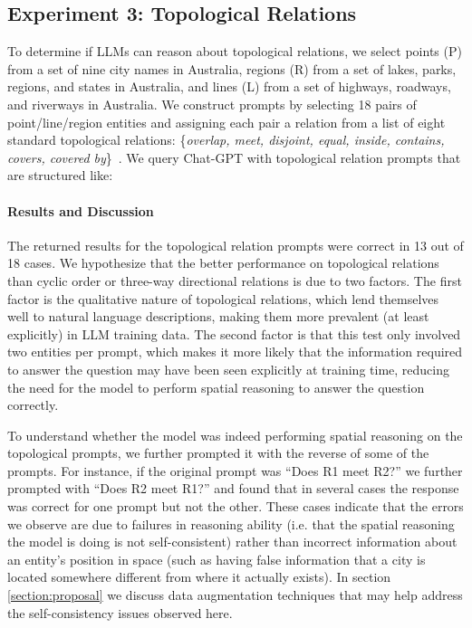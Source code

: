 \subsection{Experiment 3: Topological Relations}
To determine if LLMs can reason about topological relations, we select points (P) from a set of nine city names in Australia, regions (R) from a set of lakes, parks, regions, and states in Australia, and lines (L) from a set of highways, roadways, and riverways in Australia.
We construct prompts by selecting 18 pairs of point/line/region entities and assigning each pair a relation from a list of eight standard topological relations: \{\textit{overlap, meet, disjoint, equal, inside, contains, covers, covered by}\}~\cite{Carniel2023}.
We query Chat-GPT with topological relation prompts that are structured like:
\begin{center}
\end{center}

\paragraph{Results and Discussion}
The returned results for the topological relation prompts were correct in 13 out of 18 cases.
We hypothesize that the better performance on topological relations than cyclic order or three-way directional relations is due to two factors.
The first factor is the qualitative nature of topological relations, which lend themselves well to natural language descriptions, making them more prevalent (at least explicitly) in LLM training data.
The second factor is that this test only involved two entities per prompt, which makes it more likely that the information required to answer the question may have been seen explicitly at training time, reducing the need for the model to perform spatial reasoning to answer the question correctly.

To understand whether the model was indeed performing spatial reasoning on the topological prompts, we further prompted it with the reverse of some of the prompts.
For instance, if the original prompt was ``Does R1 meet R2?'' we further prompted with ``Does R2 meet R1?'' and found that in several cases the response was correct for one prompt but not the other.
These cases indicate that the errors we observe are due to failures in reasoning ability (i.e. that the spatial reasoning the model is doing is not self-consistent) rather than incorrect information about an entity's position in space (such as having false information that a city is located somewhere different from where it actually exists).
In section \ref{section:proposal} we discuss data augmentation techniques that may help address the self-consistency issues observed here.



